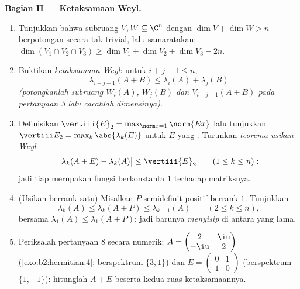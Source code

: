 \begin{problem}
\medskip
\noindent\textbf{Bagian II --- Ketaksamaan Weyl.}
\begin{enumerate}[resume]
  \item Tunjukkan bahwa subruang $V, W \subseteq \C^n$ dengan $\dim V
        + \dim W > n$ berpotongan secara tak trivial, lalu samaratakan:
        $\dim(V_1 \cap V_2 \cap V_3) \geq \dim V_1 + \dim V_2 +
        \dim V_3 - 2n$.
  \item Buktikan \emph{ketaksamaan Weyl}: untuk $i + j - 1 \leq n$,
        \[
        \lambda_{i+j-1}(A + B) \leq \lambda_i(A) +
        \lambda_j(B)
        \]
        \emph{(potongkanlah subruang $W_i(A)$, $W_j(B)$ dan
        $V_{i+j-1}(A+B)$ pada pertanyaan 3 lalu cacahlah
        dimensinya)}.
  \item Definisikan $\vertiii{E}_2 = \max_{\norm x = 1}\norm{Ex}$
        lalu tunjukkan $\vertiii E_2 = \max_k\abs{\lambda_k(E)}$ untuk
        $E$ yang . Turunkan \emph{teorema usikan
        Weyl}:
        \[
        \bigl|\lambda_k(A + E) - \lambda_k(A)\bigr| \leq
        \vertiii{E}_2
        \qquad (1 \leq k \leq n) :
        \]
        jadi tiap  merupakan fungsi  berkonstanta
        $1$ terhadap matriksnya.
  \item (Usikan berrank satu) Misalkan $P$  semidefinit
        positif berrank $1$. Tunjukkan
        \[
        \lambda_k(A) \leq \lambda_k(A + P) \leq
        \lambda_{k-1}(A) \qquad (2 \leq k \leq n),
        \]
        bersama $\lambda_1(A) \leq \lambda_1(A+P)$: jadi
         barunya \emph{menyisip} di antara yang lama.
  \item Periksalah pertanyaan 8 secara numerik: $A = \begin{pmatrix} 2 &
        \iu\\ -\iu & 2\end{pmatrix}$
        (\cref{exo:b2:hermitian:4}: berspektrum $\{3, 1\}$) dan
        $E = \begin{pmatrix} 0 & 1\\ 1 & 0\end{pmatrix}$
        (berspektrum $\{1, -1\}$): hitunglah  $A +
        E$ beserta kedua ruas ketaksamaannya.
\end{enumerate}


\end{problem}
